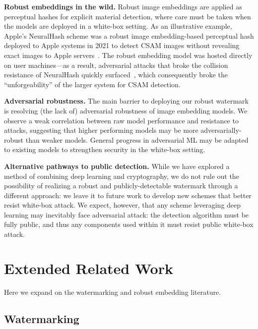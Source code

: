 \documentclass[12pt]{article}
\begin{document}
\textbf{Robust embeddings in the wild.}
Robust image embeddings are applied as perceptual hashes for explicit material detection, where care must be taken when the models are deployed in a white-box setting.
As an illustrative example, Apple's NeuralHash scheme was a robust image embedding-based perceptual hash deployed to Apple systems in 2021 to detect CSAM images without revealing exact images to Apple servers~\citep{apple2021csam}.
The robust embedding model was hosted directly on user machines---as a result, adversarial attacks that broke the collision resistance of NeuralHash quickly surfaced~\citep{struppek2022learning}, which consequently broke the ``unforgeability'' of the larger system for CSAM detection.

\textbf{Adversarial robustness.}
The main barrier to deploying our robust watermark is resolving (the lack of) adversarial robustness of image embedding models.
We observe a weak correlation between raw model performance and resistance to attacks, suggesting that higher performing models may be more adversarially-robust than weaker models.
General progress in adversarial ML may be adapted to existing models to strengthen security in the white-box setting.

\textbf{Alternative pathways to public detection.}
While we have explored a method of combining deep learning and cryptography, we do not rule out the possibility of realizing a robust and publicly-detectable watermark through a different approach: we leave it to future work to develop new schemes that better resist white-box attack.
We expect, however, that any scheme leveraging deep learning may inevitably face adversarial attack: the detection algorithm must be fully public, and thus any components used within it must resist public white-box attack.




\clearpage
\appendix

\section{Extended Related Work}\label{app:extended_rw}

Here we expand on the watermarking and robust embedding literature.

\subsection{Watermarking}
\end{document}
